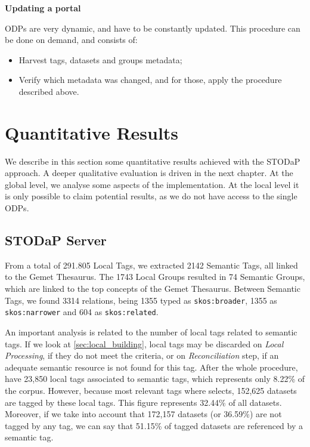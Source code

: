 \noindent \textbf{Updating a portal}

ODPs are very dynamic, and have to be constantly updated.
This procedure can be done on demand, and consists of:
\begin{itemize}
	\item Harvest tags, datasets and groups metadata;
	\item Verify which metadata was changed, and for those, apply the procedure described above.
\end{itemize}

\section{Quantitative Results}
\label{sec:results}

We describe in this section some quantitative results achieved with the STODaP approach.
A deeper qualitative evaluation is driven in the next chapter.
At the global level, we analyse some aspects of the implementation.
At the local level it is only possible to claim potential results, as we do not have access to the single ODPs.

\subsection{STODaP Server}

From a total of 291.805 Local Tags, we extracted 2142 Semantic Tags, all linked to the Gemet Thesaurus.
The 1743 Local Groups resulted in 74 Semantic Groups, which are linked to the top concepts of the Gemet Thesaurus.
Between Semantic Tags, we found 3314 relations, being 1355 typed as \texttt{skos:broader}, 1355 as \texttt{skos:narrower} and 604 as \texttt{skos:related}.

An important analysis is related to the number of local tags related to semantic tags.
If we look at \autoref{sec:local_building}, local tags may be discarded on \emph{Local Processing}, if they do not meet the criteria, or on \emph{Reconciliation} step, if an adequate semantic resource is not found for this tag.
After the whole procedure, have 23,850 local tags associated to semantic tags, which represents only 8.22\% of the corpus.
However, because most relevant tags where selects, 152,625 datasets are tagged by these local tags.
This figure represents 32.44\% of all datasets.
Moreover, if we take into account that 172,157 datasets (or 36.59\%) are not tagged by any tag, we can say that 51.15\% of tagged datasets are referenced by a semantic tag.

